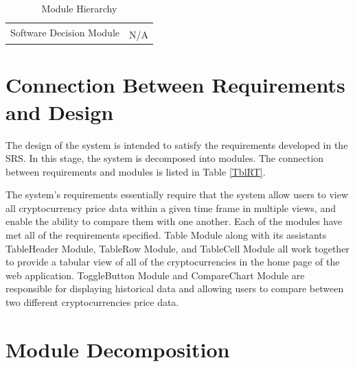 \documentclass[12pt, titlepage]{article}
\begin{document}
\begin{table}[h!]
\begin{tabular}{p{} p{}}
\multirow{3}{0.3\textwidth}{Software Decision Module}\\
& N/A\\
\bottomrule

\end{tabular}
\caption{Module Hierarchy}
\label{TblMH}
\end{table}

\newpage

\section{Connection Between Requirements and Design} \label{SecConnection}

The design of the system is intended to satisfy the requirements developed in
the SRS. In this stage, the system is decomposed into modules. The connection
between requirements and modules is listed in Table \ref{TblRT}.

The system's requirements essentially require that the system allow users to view all cryptocurrency price data within a given time frame in multiple views, and enable the ability to compare them with one another. Each of the modules have met all of the requirements specified. Table Module along with its assistants TableHeader Module, TableRow Module, and TableCell Module all work together to provide a tabular view of all of the cryptocurrencies in the home page of the web application. ToggleButton Module and CompareChart Module are responsible for displaying historical data and allowing users to compare between two different cryptocurrencies price data. 

\section{Module Decomposition} \label{SecMD}

\end{document}
